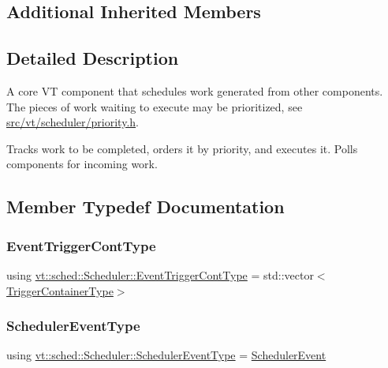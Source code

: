 \subsection*{Additional Inherited Members}


\subsection{Detailed Description}
A core VT component that schedules work generated from other components. The pieces of work waiting to execute may be prioritized, see \hyperlink{priority_8h}{src/vt/scheduler/priority.\+h}. 

Tracks work to be completed, orders it by priority, and executes it. Polls components for incoming work. 

\subsection{Member Typedef Documentation}
\mbox{\label{structvt_1_1sched_1_1_scheduler_a68203230dc48285d3d50bbb363ed267b}} 
\subsubsection{\texorpdfstring{Event\+Trigger\+Cont\+Type}{EventTriggerContType}}
{\footnotesize\ttfamily using \hyperlink{structvt_1_1sched_1_1_scheduler_a68203230dc48285d3d50bbb363ed267b}{vt\+::sched\+::\+Scheduler\+::\+Event\+Trigger\+Cont\+Type} =  std\+::vector$<$\hyperlink{structvt_1_1sched_1_1_scheduler_a0b9fe2a5ee31ca84fa52764a126ad666}{Trigger\+Container\+Type}$>$}

\mbox{\label{structvt_1_1sched_1_1_scheduler_ad40b8136b7810da5bab9b27e317e4eb3}} 
\subsubsection{\texorpdfstring{Scheduler\+Event\+Type}{SchedulerEventType}}
{\footnotesize\ttfamily using \hyperlink{namespacevt_1_1sched_a54756ec39b60951d6765fcfa692d1616}{vt\+::sched\+::\+Scheduler\+::\+Scheduler\+Event\+Type} =  \hyperlink{namespacevt_1_1sched_a54756ec39b60951d6765fcfa692d1616}{Scheduler\+Event}}

